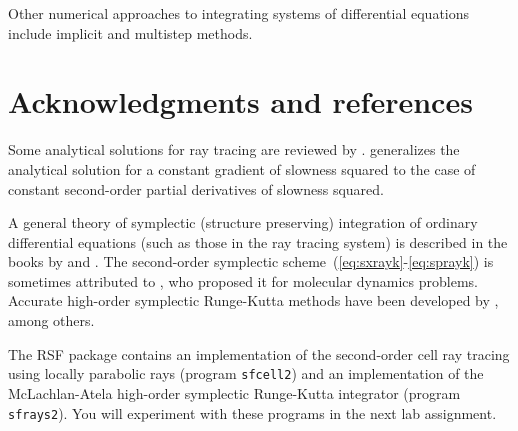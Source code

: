 Other numerical approaches to integrating systems of differential
equations include implicit and multistep methods.




\section{Acknowledgments and references}

Some analytical solutions for ray tracing are reviewed by
\cite{cerveny}.  \cite{kornig} generalizes the analytical solution for
a constant gradient of slowness squared to the case of constant
second-order partial derivatives of slowness squared. 

A general theory of symplectic (structure preserving) integration of
ordinary differential equations (such as those in the ray tracing
system) is described in the books by \cite{serna} and
\cite{symplectic}. The second-order symplectic
scheme~(\ref{eq:sxrayk}-\ref{eq:sprayk}) is sometimes attributed to
\cite{verlet}, who proposed it for molecular dynamics
problems. Accurate high-order symplectic Runge-Kutta methods have been
developed by \cite{atela}, among others.

The RSF package contains an implementation of the second-order cell
ray tracing using locally parabolic rays (program \texttt{sfcell2})
and an implementation of the McLachlan-Atela high-order symplectic
Runge-Kutta integrator (program \texttt{sfrays2}). You will experiment
with these programs in the next lab assignment.




%

